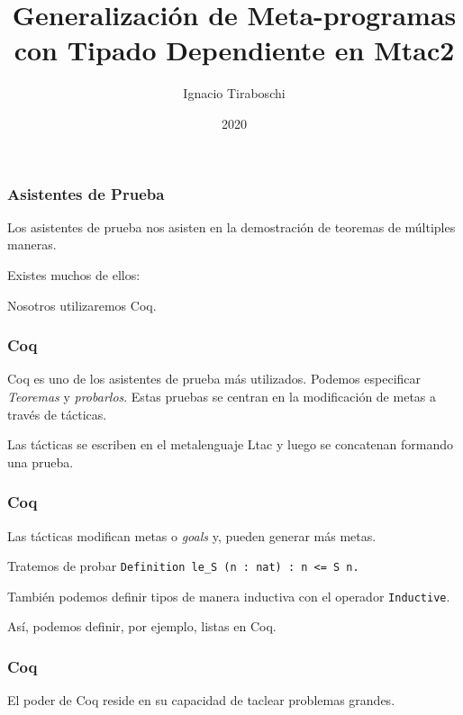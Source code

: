 \documentclass{beamer}
\title{Generalización de Meta-programas con Tipado Dependiente en Mtac2}
\author{Ignacio Tiraboschi}
\institute{Universidad Nacional de Córdoba - FAMAF}
\date{2020}
\begin{document}
\frame{\titlepage}

\begin{frame}
\frametitle{Asistentes de Prueba}

Los asistentes de prueba nos asisten en la demostración de teoremas de múltiples maneras.
\vspace{\baselineskip}

Existes muchos de ellos:
\vspace{\baselineskip}

Nosotros utilizaremos Coq.

\end{frame}

\begin{frame}
\frametitle{Coq}
Coq es uno de los asistentes de prueba más utilizados.
Podemos especificar \emph{Teoremas} y \emph{probarlos}.
Estas pruebas se centran en la modificación de metas a través de tácticas.
\vspace{\baselineskip}

Las tácticas se escriben en el metalenguaje Ltac y luego se concatenan formando una prueba.
\end{frame}

\begin{frame}
\frametitle{Coq}

Las tácticas modifican metas o \emph{goals} y, pueden generar más metas.
\vspace{\baselineskip}

Tratemos de probar \lstinline{Definition le_S (n : nat) : n <= S n.}
\vspace{\baselineskip}

También podemos definir tipos de manera inductiva con el operador \lstinline{Inductive}.
\vspace{\baselineskip}

Así, podemos definir, por ejemplo, listas en Coq.

\end{frame}

\begin{frame}
\frametitle{Coq}

El poder de Coq reside en su capacidad de taclear problemas grandes.
\vspace{\baselineskip}



\end{frame}
\end{document}
